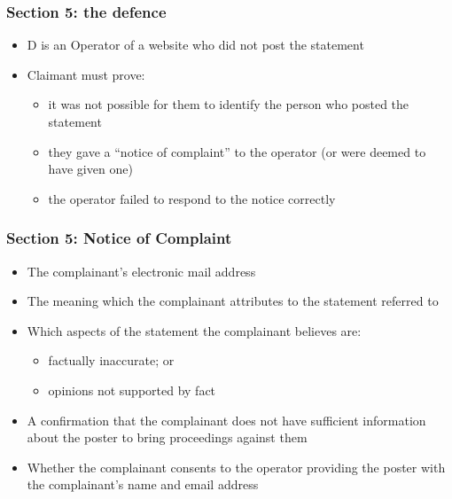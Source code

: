 \documentclass[ignorenonframetext,]{beamer}
\begin{document}
\begin{frame}
  \frametitle{Section 5: the defence}
  \begin{itemize}
  \item D is an Operator of a website who did not post the statement
  \item Claimant must prove:
    \begin{itemize}
    \item it was not possible for them to identify the person who posted the statement
    \item they gave a ``notice of complaint'' to the operator (or were deemed to have given one)
    \item the operator failed to respond to the notice correctly
    \end{itemize}
  \end{itemize}
\end{frame}

\begin{frame}
  \frametitle{Section 5: Notice of Complaint}

  \begin{itemize}
  \item The complainant's electronic mail address
  \item The meaning which the complainant attributes to the statement referred to
  \item Which aspects of the statement the complainant believes are:
    \begin{itemize}
    \item factually inaccurate; or
    \item opinions not supported by fact
    \end{itemize}
  \item A confirmation that the complainant does not have sufficient information about the poster to bring proceedings against them
  \item Whether the complainant consents to the operator providing the poster with the complainant's name and email address
\end{itemize}

\end{frame}
\end{document}
